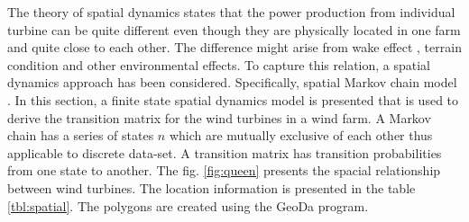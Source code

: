The theory of spatial dynamics states that the power production from individual turbine can be quite different even though they are physically located in one farm and quite close to each other. The difference might arise from wake effect , terrain condition and other environmental effects. 
To capture this relation, a spatial dynamics approach has been considered. Specifically, spatial Markov chain model \cite{rey2001spatial,carle1997modeling}. In this section, a finite state spatial dynamics model is presented that is used to derive the transition matrix for the wind turbines in a wind farm. 
A Markov chain has a series of states $n$ which are mutually exclusive of each other thus applicable to discrete data-set. A transition matrix has transition probabilities from one state to another. The fig. \ref{fig:queen} presents the spacial relationship between wind turbines. The location information is presented in the table \ref{tbl:spatial}. The polygons are created using the GeoDa \cite{anselin2006geoda} program. 

